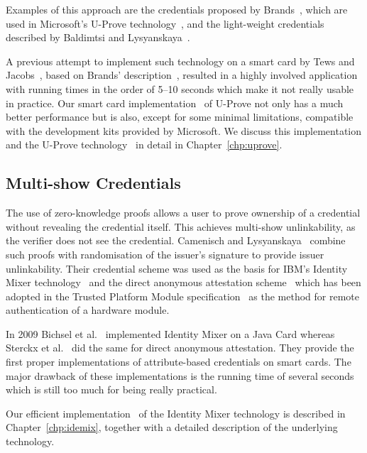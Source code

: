 Examples of this approach are the credentials proposed by
Brands~\cite{Brands2000}, which are used in Microsoft's U-Prove
technology~\cite{U-Prove_Crypto2013}, and the light-weight credentials described
by Baldimtsi and Lysyanskaya~\cite{BaLy2012}.

A previous attempt to implement such technology on a smart card by Tews and
Jacobs~\cite{TewsJacobs09}, based on Brands' description~\cite{Brands2000},
resulted in a highly involved application with running times in the order of
5--10 seconds which make it not really usable in practice. Our smart card
implementation~\cite{MostowskiVullers11} of U-Prove not only has a much better
performance but is also, except for some minimal limitations, compatible with
the development kits provided by Microsoft. We discuss this implementation and
the U-Prove technology~\cite{U-Prove_Crypto2013} in detail in
Chapter~\ref{chp:uprove}.

\subsection{Multi-show Credentials}

The use of zero-knowledge proofs allows a user to prove ownership of a credential
without revealing the credential itself. This achieves multi-show unlinkability,
as the verifier does not see the credential. Camenisch and
Lysyanskaya~\cite{CamenischLysyanskaya2001,CamenischLysyanskaya2003} combine
such proofs with randomisation of the issuer's signature to provide issuer
unlinkability. Their credential scheme was used as the basis for IBM's Identity
Mixer technology~\cite{IdemixCrypto2012} and the direct anonymous attestation 
scheme~\cite{BrickellCC04} which has been adopted in the Trusted Platform Module
specification~\cite{TPM_1.2} as the method for remote authentication of a
hardware module.

In 2009 Bichsel et al.~\cite{BichselCGS2009} implemented Identity Mixer on a
Java Card whereas Sterckx et al.~\cite{Sterckx09} did the same for direct
anonymous attestation. They provide the first proper implementations of
attribute-based credentials on smart cards. The major drawback of these
implementations is the running time of several seconds which is still too much
for being really practical.

Our efficient implementation~\cite{VullersAlpar2013} of the Identity Mixer
technology is described in Chapter~\ref{chp:idemix}, together with a detailed
description of the underlying technology.

